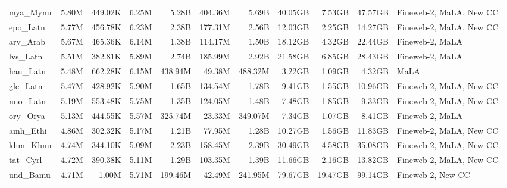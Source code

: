 \begin{table*}[!htp]
{\begin{tabular}{l|rrr|rrr|rrr|l}
mya\_Mymr                   & 5.80M      & 449.02K      & 6.25M       & 5.28B        & 404.36M        & 5.69B         & 40.05GB    & 7.53GB       & 47.57GB     & Fineweb-2, MaLA, New CC \\
epo\_Latn                   & 5.77M      & 456.78K      & 6.23M       & 2.38B        & 177.31M        & 2.56B         & 12.03GB    & 2.25GB       & 14.27GB     & Fineweb-2, MaLA, New CC \\
ary\_Arab                   & 5.67M      & 465.36K      & 6.14M       & 1.38B        & 114.17M        & 1.50B         & 18.12GB    & 4.32GB       & 22.44GB     & Fineweb-2, MaLA         \\
lvs\_Latn                   & 5.51M      & 382.81K      & 5.89M       & 2.74B        & 185.99M        & 2.92B         & 21.58GB    & 6.85GB       & 28.43GB     & Fineweb-2, MaLA         \\
hau\_Latn                   & 5.48M      & 662.28K      & 6.15M       & 438.94M      & 49.38M         & 488.32M       & 3.22GB     & 1.09GB       & 4.32GB      & MaLA                    \\
gle\_Latn                   & 5.47M      & 428.92K      & 5.90M       & 1.65B        & 134.54M        & 1.78B         & 9.41GB     & 1.55GB       & 10.96GB     & Fineweb-2, MaLA, New CC \\
nno\_Latn                   & 5.19M      & 553.48K      & 5.75M       & 1.35B        & 124.05M        & 1.48B         & 7.48GB     & 1.85GB       & 9.33GB      & Fineweb-2, MaLA, New CC \\
ory\_Orya                   & 5.13M      & 444.55K      & 5.57M       & 325.74M      & 23.33M         & 349.07M       & 7.34GB     & 1.07GB       & 8.41GB      & Fineweb-2, MaLA         \\
amh\_Ethi                   & 4.86M      & 302.32K      & 5.17M       & 1.21B        & 77.95M         & 1.28B         & 10.27GB    & 1.56GB       & 11.83GB     & Fineweb-2, MaLA, New CC \\
khm\_Khmr                   & 4.74M      & 344.10K      & 5.09M       & 2.23B        & 158.45M        & 2.39B         & 30.49GB    & 4.58GB       & 35.08GB     & Fineweb-2, MaLA, New CC \\
tat\_Cyrl                   & 4.72M      & 390.38K      & 5.11M       & 1.29B        & 103.35M        & 1.39B         & 11.66GB    & 2.16GB       & 13.82GB     & Fineweb-2, MaLA, New CC \\
und\_Bamu                   & 4.71M      & 1.00M        & 5.71M       & 199.46M      & 42.49M         & 241.95M       & 79.67GB    & 19.47GB      & 99.14GB     & Fineweb-2, New CC       \\

\end{tabular}}
\end{table*}
